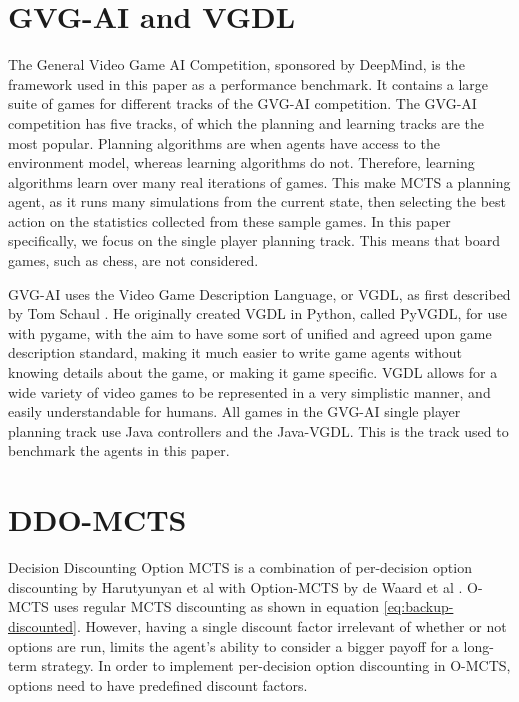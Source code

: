 \documentclass[12pt,a4paper]{article}
\begin{document}
\begin{multicols}{2}
\section{GVG-AI and VGDL}
The General Video Game AI Competition, sponsored by DeepMind, is the framework used in this paper as a performance benchmark. It contains a large suite of games for different tracks of the GVG-AI competition. The GVG-AI competition has five tracks, of which the  planning and learning tracks are the most popular. Planning algorithms are when agents have access to the environment model, whereas learning algorithms do not. Therefore, learning algorithms learn over many real iterations of games. This make MCTS a planning agent, as it runs many simulations from the current state, then selecting the best action on the statistics collected from these sample games. In this paper specifically, we focus on the single player planning track. This means that board games, such as chess, are not considered.

GVG-AI uses the Video Game Description Language, or VGDL, as first described by Tom Schaul \cite{6633610}. He originally created VGDL in Python, called PyVGDL, for use with pygame, with the aim to have some sort of unified and agreed upon game description standard, making it much easier to write game agents without knowing details about the game, or making it game specific. VGDL allows for a wide variety of video games to be represented in a very simplistic manner, and easily understandable for humans. All games in the GVG-AI single player planning track use Java controllers and the Java-VGDL. This is the track used to benchmark the agents in this paper.

\section{DDO-MCTS}
Decision Discounting Option MCTS is a combination of per-decision option discounting by Harutyunyan et al \cite{pmlr-v97-harutyunyan19a} with Option-MCTS by de Waard et al \cite{de2016monte}. O-MCTS uses regular MCTS discounting as shown in equation \eqref{eq:backup-discounted}. However, having a single discount factor irrelevant of whether or not options are run, limits the agent's ability to consider a bigger payoff for a long-term strategy. In order to implement per-decision option discounting in O-MCTS, options need to have predefined discount factors.


\end{multicols}
\end{document}
